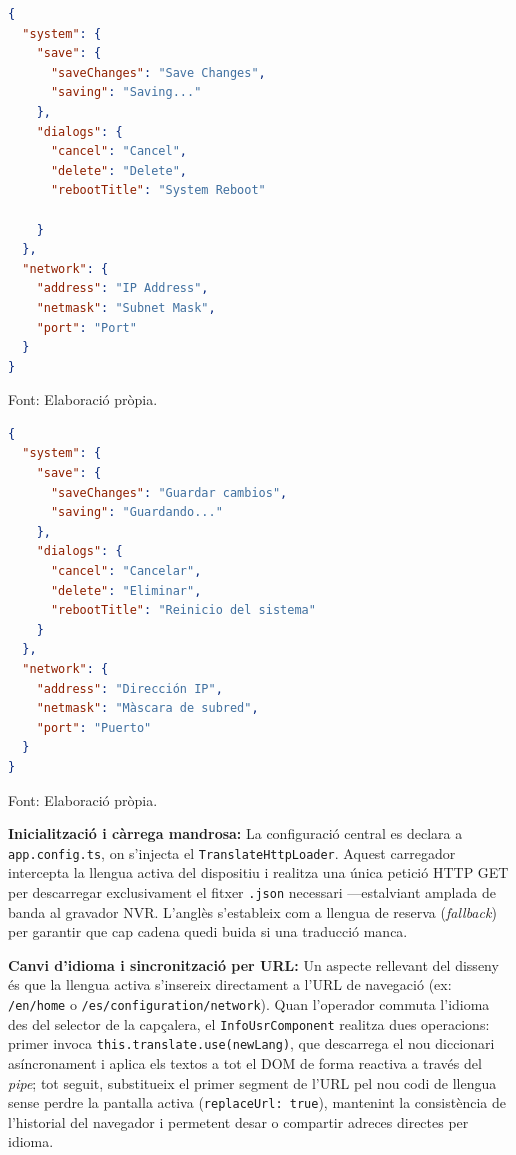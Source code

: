 \vspace{0.5em}
\noindent
\begin{minipage}[t]{0.48\textwidth}
\begin{lstlisting}[basicstyle=\scriptsize\ttfamily, language=json, numbers=none, caption={\small\texttt{en.json} — Fitxer de traduccions anglès.}, label={lst:i18n_en}]
{
  "system": {
    "save": {
      "saveChanges": "Save Changes",
      "saving": "Saving..."
    },
    "dialogs": {
      "cancel": "Cancel",
      "delete": "Delete",
      "rebootTitle": "System Reboot"

    }
  },
  "network": {
    "address": "IP Address",
    "netmask": "Subnet Mask",
    "port": "Port"
  }
}
\end{lstlisting}
\smallskip\par{\small\noindent Font: Elaboració pròpia.}
\end{minipage}%
\hfill%
\begin{minipage}[t]{0.48\textwidth}
\begin{lstlisting}[basicstyle=\scriptsize\ttfamily, language=json, numbers=none, caption={\small\texttt{es.json} — Fitxer de traduccions espanyol.}, label={lst:i18n_es}]
{
  "system": {
    "save": {
      "saveChanges": "Guardar cambios",
      "saving": "Guardando..."
    },
    "dialogs": {
      "cancel": "Cancelar",
      "delete": "Eliminar",
      "rebootTitle": "Reinicio del sistema"
    }
  },
  "network": {
    "address": "Dirección IP",
    "netmask": "Màscara de subred",
    "port": "Puerto"
  }
}
\end{lstlisting}
\smallskip\par{\small\noindent Font: Elaboració pròpia.}
\end{minipage}
\vspace{0.5em}
\medskip

\textbf{Inicialització i càrrega mandrosa:} La configuració central es declara a \texttt{app.config.ts}, on s'injecta el \texttt{TranslateHttpLoader}. Aquest carregador intercepta la llengua activa del dispositiu i realitza una única petició HTTP GET per descarregar exclusivament el fitxer \texttt{.json} necessari —estalviant amplada de banda al gravador NVR. L'anglès s'estableix com a llengua de reserva (\textit{fallback}) per garantir que cap cadena quedi buida si una traducció manca.

\textbf{Canvi d'idioma i sincronització per URL:} Un aspecte rellevant del disseny és que la llengua activa s'insereix directament a l'URL de navegació (ex: \texttt{/en/home} o \texttt{/es/configuration/network}). Quan l'operador commuta l'idioma des del selector de la capçalera, el \texttt{InfoUsrComponent} realitza dues operacions: primer invoca \texttt{this.translate.use(newLang)}, que descarrega el nou diccionari asíncronament i aplica els textos a tot el DOM de forma reactiva a través del \textit{pipe}; tot seguit, substitueix el primer segment de l'URL pel nou codi de llengua sense perdre la pantalla activa (\texttt{replaceUrl: true}), mantenint la consistència de l'historial del navegador i permetent desar o compartir adreces directes per idioma.

